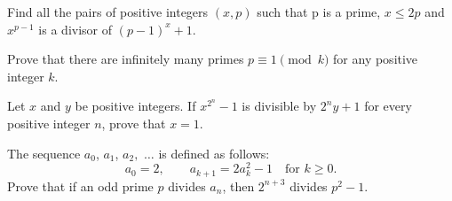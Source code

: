 \documentclass{article}
\begin{document}
\begin{prob}[IMO 1999/4]{9}
Find all the pairs of positive integers $(x,p)$ such that p is a prime, $x \leq 2p$ and $x^{p-1}$ is a divisor of $ (p-1)^{x}+1$.
\end{prob}

\begin{prob}{9}
Prove that there are infinitely many primes $p\equiv 1\pmod{k}$ for any positive integer $k$.
\end{prob}

\begin{prob}[ISL 2012/N6]{9}
Let $x$ and $y$ be positive integers. If ${x^{2^n}}-1$ is divisible by $2^ny+1$ for every positive integer $n$, prove that $x=1$.
\end{prob}

\begin{prob}[ISL 2003/N7]{13}
The sequence $a_0$, $a_1$, $a_2,$ $\ldots$ is defined as follows:
\[a_0=2, \qquad a_{k+1}=2a_k^2-1 \quad\text{for }k \geq 0.\]
Prove that if an odd prime $p$ divides $a_n$, then $2^{n+3}$ divides $p^2-1$.
\end{prob}

\end{document}
